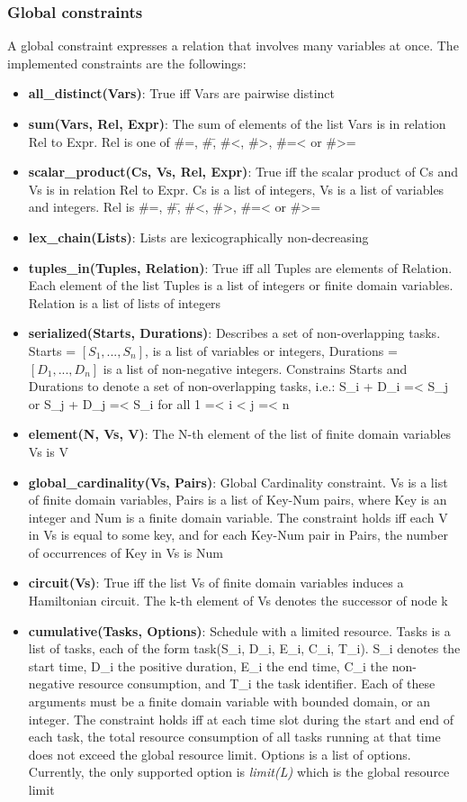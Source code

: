 \subsubsection{Global constraints}\label{subsubsec:global_constraints}
A global constraint expresses a relation that involves many variables at once. The implemented constraints are the followings:
\begin{itemize}
    \item \textbf{all\_distinct(Vars)}: True iff Vars are pairwise distinct
    \item \textbf{sum(Vars, Rel, Expr)}: The sum of elements of the list Vars is in relation Rel to Expr. Rel is one of \#=, \#\=, \#<, \#>, \#=< or \#>=
    \item \textbf{scalar\_product(Cs, Vs, Rel, Expr)}: True iff the scalar product of Cs and Vs is in relation Rel to Expr. Cs is a list of integers, Vs is a list of variables and integers. Rel is \#=, \#\=, \#<, \#>, \#=< or \#>=
    \item \textbf{lex\_chain(Lists)}: Lists are lexicographically non-decreasing
    \item \textbf{tuples\_in(Tuples, Relation)}: True iff all Tuples are elements of Relation. Each element of the list Tuples is a list of integers or finite domain variables. Relation is a list of lists of integers
    \item \textbf{serialized(Starts, Durations)}: Describes a set of non-overlapping tasks. Starts = $[S_1,...,S_n]$, is a list of variables or integers, Durations = $[D_1,...,D_n]$ is a list of non-negative integers. Constrains Starts and Durations to denote a set of non-overlapping tasks, i.e.: S\_i + D\_i =< S\_j or S\_j + D\_j =< S\_i for all 1 =< i < j =< n
    \item \textbf{element(N, Vs, V)}: The N-th element of the list of finite domain variables Vs is V
    \item \textbf{global\_cardinality(Vs, Pairs)}: Global Cardinality constraint. Vs is a list of finite domain variables, Pairs is a list of Key-Num pairs, where Key is an integer and Num is a finite domain variable. The constraint holds iff each V in Vs is equal to some key, and for each Key-Num pair in Pairs, the number of occurrences of Key in Vs is Num
    \item \textbf{circuit(Vs)}: True iff the list Vs of finite domain variables induces a Hamiltonian circuit. The k-th element of Vs denotes the successor of node k
    \item \textbf{cumulative(Tasks, Options)}: Schedule with a limited resource. Tasks is a list of tasks, each of the form task(S\_i, D\_i, E\_i, C\_i, T\_i). S\_i denotes the start time, D\_i the positive duration, E\_i the end time, C\_i the non-negative resource consumption, and T\_i the task identifier. Each of these arguments must be a finite domain variable with bounded domain, or an integer. The constraint holds iff at each time slot during the start and end of each task, the total resource consumption of all tasks running at that time does not exceed the global resource limit. Options is a list of options. Currently, the only supported option is \textit{limit(L)} which is the global resource limit

\end{itemize}
